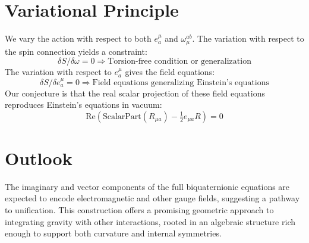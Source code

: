 \documentclass[11pt]{article}
\begin{document}
\section{Variational Principle}
We vary the action with respect to both \( e^\mu_a \) and \( \omega_\mu^{ab} \). The variation with respect to the spin connection yields a constraint:
\[
\delta S / \delta \omega = 0 \Rightarrow \text{Torsion-free condition or generalization}
\]
The variation with respect to \( e^\mu_a \) gives the field equations:
\[
\delta S / \delta e^\mu_a = 0 \Rightarrow \text{Field equations generalizing Einstein's equations}
\]
Our conjecture is that the real scalar projection of these field equations reproduces Einstein's equations in vacuum:
\[
\text{Re}( \text{ScalarPart}(R_{\mu a}) - \tfrac{1}{2} e_{\mu a} R ) = 0
\]

\section{Outlook}
The imaginary and vector components of the full biquaternionic equations are expected to encode electromagnetic and other gauge fields, suggesting a pathway to unification. This construction offers a promising geometric approach to integrating gravity with other interactions, rooted in an algebraic structure rich enough to support both curvature and internal symmetries.
\end{document}
